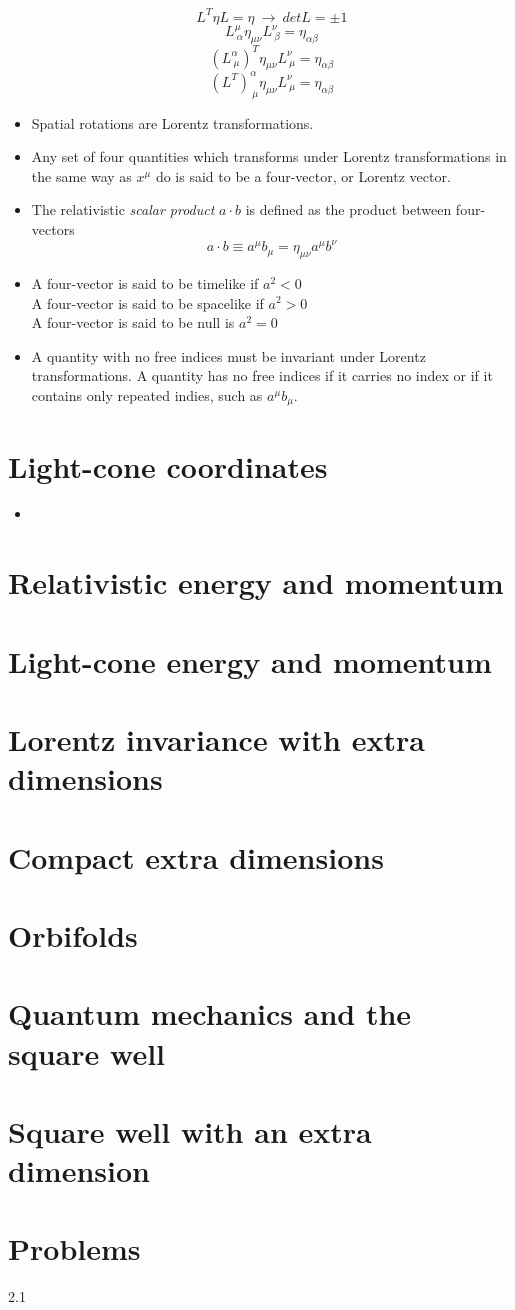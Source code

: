 \documentclass[12pt]{report}
\begin{document}
\begin{itemize}
{    $$ L^T\eta L = \eta \ \longrightarrow \ detL=\pm1 $$ $$L^\mu_{\ \alpha} \eta_{\mu \nu} L^\nu_ {\ \beta} =\eta_{\alpha \beta}$$ $$(L^\alpha_{\ \mu})^T\eta_{\mu \nu} L^\nu_{\ \mu} =\eta_{\alpha \beta}$$ $$(L^T)^\alpha_{\ \mu}\eta_{\mu \nu} L^\nu_{\ \mu} =\eta_{\alpha \beta}$$}
    \item Spatial rotations are Lorentz transformations.
    \item Any set of four quantities which transforms under Lorentz transformations in the same way as $x^\mu$ do is said to be a four-vector, or Lorentz vector.
    \item The relativistic \textit{scalar product} $a\cdot b$ is defined as the product between four-vectors $$a\cdot b \equiv a^\mu b_ \mu = \eta_{\mu \nu} a^\mu b^\nu$$
    \item A four-vector is said to be timelike if $a^2<0$\\
    A four-vector is said to be spacelike if $a^2>0$\\
    A four-vector is said to be null is $a^2 =0$
    \item A quantity with no free indices must be invariant under Lorentz transformations.
    A quantity has no free indices if it carries no index or if it contains only repeated indies, such as $a^\mu b_ \mu$.
\end{itemize}
\section{Light-cone coordinates}
\begin{itemize}
    \item 
\end{itemize}
\section{Relativistic energy and momentum}
\section{Light-cone energy and momentum}
\section{Lorentz invariance with extra dimensions}
\section{Compact extra dimensions}
\section{Orbifolds}
\section{Quantum mechanics and the square well}
\section{Square well with an extra dimension}
\section{Problems}
2.1
\end{document}
